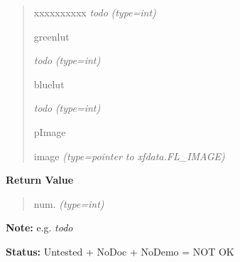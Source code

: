 \begin{boxedminipage}{\funcwidth}
\begin{quote}
\begin{Ventry}{xxxxxxxxxx}
\emph{todo}
            {\it (type=int)}

          \item[greenlut]


\emph{todo}
            {\it (type=int)}

          \item[bluelut]


\emph{todo}
            {\it (type=int)}

          \item[pImage]


image
            {\it (type=pointer to xfdata.FL\_IMAGE)}

        \end{Ventry}

      \end{quote}

      \textbf{Return Value}
    \vspace{-1ex}

      \begin{quote}

num.
      {\it (type=int)}

      \end{quote}

\textbf{Note:} 
e.g. \emph{todo}


\textbf{Status:} 
Untested + NoDoc + NoDemo = NOT OK


    \end{boxedminipage}

    \label{xformslib:flflimage:fl_make_submatrix}

    \vspace{0.5ex}

